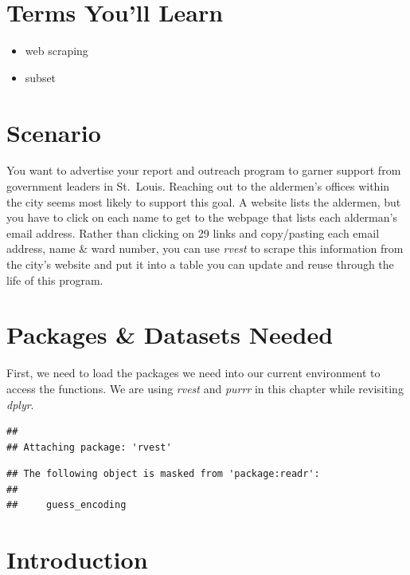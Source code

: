 \documentclass[
  krantz2]{krantz}
\providecommand{\tightlist}{%
  \setlength{\itemsep}{0pt}\setlength{\parskip}{0pt}}
\begin{document}
\hypertarget{rvest-terms}{%
\section{Terms You'll Learn}\label{rvest-terms}}

\begin{itemize}
\tightlist
\item
  web scraping
\item
  subset
\end{itemize}

\hypertarget{rvest-scenario}{%
\section{Scenario}\label{rvest-scenario}}

You want to advertise your report and outreach program to garner support from government leaders in St.~Louis. Reaching out to the aldermen's offices within the city seems most likely to support this goal. A website lists the aldermen, but you have to click on each name to get to the webpage that lists each alderman's email address. Rather than clicking on 29 links and copy/pasting each email address, name \& ward number, you can use \emph{rvest} to scrape this information from the city's website and put it into a table you can update and reuse through the life of this program.

\hypertarget{rvest-pkgs}{%
\section{Packages \& Datasets Needed}\label{rvest-pkgs}}

First, we need to load the packages we need into our current environment to access the functions. We are using \emph{rvest} and \emph{purrr} in this chapter while revisiting \emph{dplyr}.

\begin{verbatim}
##
## Attaching package: 'rvest'
\end{verbatim}

\begin{verbatim}
## The following object is masked from 'package:readr':
##
##     guess_encoding
\end{verbatim}

\hypertarget{rvest-intro}{%
\section{Introduction}\label{rvest-intro}}
\end{document}
